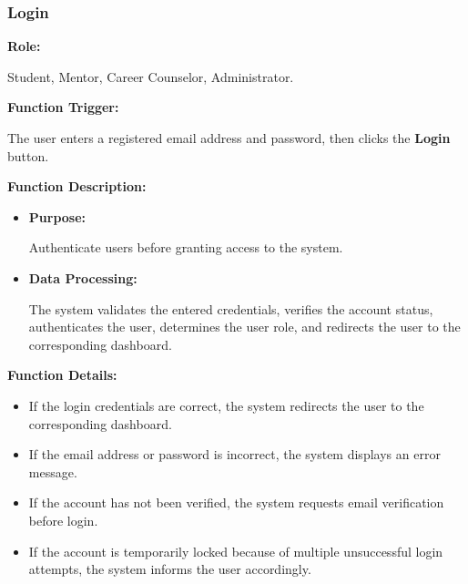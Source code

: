 \subsubsection{Login}

\textbf{Role:}

Student, Mentor, Career Counselor, Administrator.

\vspace{0.3cm}

\textbf{Function Trigger:}

The user enters a registered email address and password, then clicks the \textbf{Login} button.

\vspace{0.3cm}

\textbf{Function Description:}

\begin{itemize}
    \item \textbf{Purpose:}

    Authenticate users before granting access to the system.

    \item \textbf{Data Processing:}

    The system validates the entered credentials, verifies the account status, authenticates the user, determines the user role, and redirects the user to the corresponding dashboard.
\end{itemize}

\vspace{0.3cm}

\textbf{Function Details:}

\begin{itemize}
    \item If the login credentials are correct, the system redirects the user to the corresponding dashboard.

    \item If the email address or password is incorrect, the system displays an error message.

    \item If the account has not been verified, the system requests email verification before login.

    \item If the account is temporarily locked because of multiple unsuccessful login attempts, the system informs the user accordingly.
\end{itemize}


